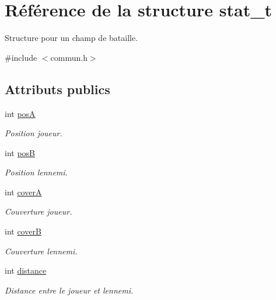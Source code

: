 \hypertarget{structstat__t}{}\section{Référence de la structure stat\+\_\+t}
\label{structstat__t}


Structure pour un champ de bataille.  




{\ttfamily \#include $<$commun.\+h$>$}

\subsection*{Attributs publics}
\begin{DoxyCompactItemize}
\item 
\mbox{\label{structstat__t_a1461c1b3e09f4d63771a22ea216c9af1}} 
int \hyperlink{structstat__t_a1461c1b3e09f4d63771a22ea216c9af1}{posA}
\begin{DoxyCompactList}\small\item\em Position joueur. \end{DoxyCompactList}\item 
\mbox{\label{structstat__t_a035d6bf125231d37fbb828c51b4b3be5}} 
int \hyperlink{structstat__t_a035d6bf125231d37fbb828c51b4b3be5}{posB}
\begin{DoxyCompactList}\small\item\em Position l\textquotesingle{}ennemi. \end{DoxyCompactList}\item 
\mbox{\label{structstat__t_a2cd6c4686971592b293c16deadf5f563}} 
int \hyperlink{structstat__t_a2cd6c4686971592b293c16deadf5f563}{coverA}
\begin{DoxyCompactList}\small\item\em Couverture joueur. \end{DoxyCompactList}\item 
\mbox{\label{structstat__t_a1788077cd96cb6bc51a994f273bb15a4}} 
int \hyperlink{structstat__t_a1788077cd96cb6bc51a994f273bb15a4}{coverB}
\begin{DoxyCompactList}\small\item\em Couverture l\textquotesingle{}ennemi. \end{DoxyCompactList}\item 
\mbox{\label{structstat__t_ae606770ecee3d8aa6b037e3f4bc354ec}} 
int \hyperlink{structstat__t_ae606770ecee3d8aa6b037e3f4bc354ec}{distance}
\begin{DoxyCompactList}\small\item\em Distance entre le joueur et l\textquotesingle{}ennemi. \end{DoxyCompactList}\end{DoxyCompactItemize}


